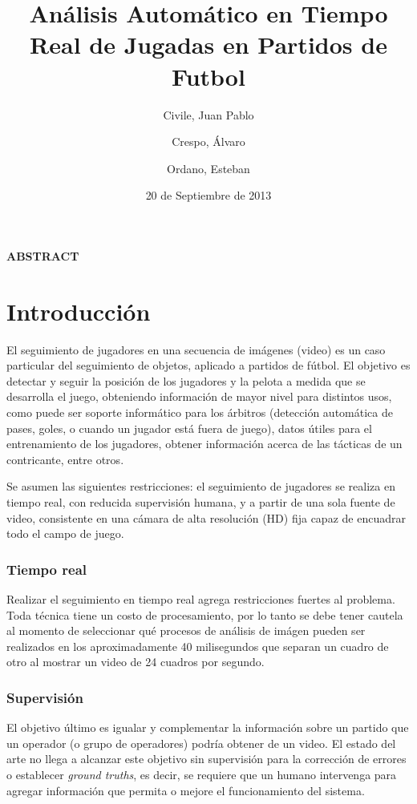 \documentclass[a4paper,10pt]{article}
\title{Análisis Automático en Tiempo Real de Jugadas en Partidos de Futbol}
\date{20 de Septiembre de 2013}
\author{Civile, Juan Pablo \and Crespo, Álvaro \and Ordano, Esteban }
\begin{document}
\pagestyle{fancy}
\maketitle
\thispagestyle{fancy}


\begin{customabstract}
\textbf{
ABSTRACT
} \end{customabstract}

\section{Introducción}

El seguimiento de jugadores en una secuencia de imágenes (video) es un caso
particular del seguimiento de objetos, aplicado a partidos de fútbol. El
objetivo es detectar y seguir la posición de los jugadores y la pelota a medida
que se desarrolla el juego, obteniendo información de mayor nivel para
distintos usos, como puede ser soporte informático para los árbitros
(detección automática de pases, goles, o cuando un jugador está fuera de
juego), datos útiles para el entrenamiento de los jugadores, obtener
información acerca de las tácticas de un contricante, entre otros.

Se asumen las siguientes restricciones: el seguimiento de jugadores se
realiza en tiempo real, con reducida supervisión humana, y a partir de una sola
fuente de video, consistente en una cámara de alta resolución (HD) fija capaz
de encuadrar todo el campo de juego.

\subsubsection{Tiempo real}

Realizar el seguimiento en tiempo real agrega restricciones fuertes al
problema. Toda técnica tiene un costo de procesamiento, por lo tanto se debe
tener cautela al momento de seleccionar qué procesos de análisis de imágen
pueden ser realizados en los aproximadamente 40 milisegundos que separan un
cuadro de otro al mostrar un video de 24 cuadros por segundo.

\subsubsection{Supervisión}

El objetivo último es igualar y complementar la información sobre un partido
que un operador (o grupo de operadores) podría obtener de un video. El estado
del arte no llega a alcanzar este objetivo sin supervisión para la corrección
de errores o establecer \textit{ground truths}, es decir, se requiere que un
humano intervenga para agregar información que permita o mejore el
funcionamiento del sistema.
\end{document}
